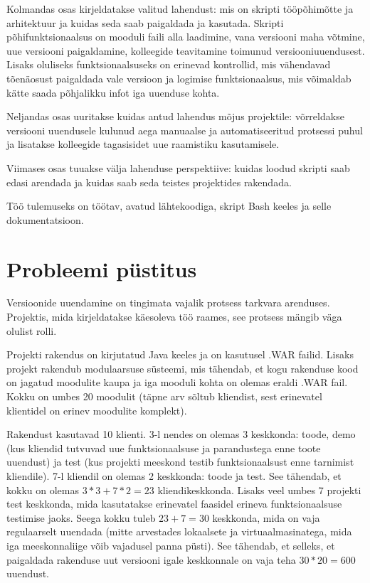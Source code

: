 \documentclass[12pt]{report}
\begin{document}
  Kolmandas osas kirjeldatakse valitud lahendust: mis on skripti tööpõhimõtte ja arhitektuur ja kuidas seda saab paigaldada ja kasutada. Skripti põhifunktsionaalsus on mooduli faili alla laadimine, vana versiooni maha võtmine, uue versiooni paigaldamine, kolleegide teavitamine toimunud versiooniuuendusest. Lisaks oluliseks funktsionaalsuseks on erinevad kontrollid, mis vähendavad tõenäosust paigaldada vale versioon ja logimise funktsionaalsus, mis võimaldab kätte saada põhjalikku infot iga uuenduse kohta.
  
  Neljandas osas uuritakse kuidas antud lahendus mõjus projektile: võrreldakse versiooni uuendusele kulunud aega manuaalse ja automatiseeritud protsessi puhul ja lisatakse kolleegide tagasisidet uue raamistiku kasutamisele.
  
  Viimases osas tuuakse välja lahenduse perspektiive: kuidas loodud skripti saab edasi arendada ja kuidas saab seda teistes projektides rakendada.
  
  Töö tulemuseks on töötav, avatud lähtekoodiga, skript Bash keeles ja selle dokumentatsioon.
  
  \newpage
  
  \section{Probleemi püstitus}
  
  Versioonide uuendamine on tingimata vajalik protsess tarkvara arenduses. Projektis, mida kirjeldatakse käesoleva töö raames, see protsess mängib väga olulist rolli.
  
  Projekti rakendus on kirjutatud Java keeles ja on kasutusel .WAR failid. Lisaks projekt rakendub modulaarsuse süsteemi, mis tähendab, et kogu rakenduse kood on jagatud moodulite kaupa ja iga mooduli kohta on olemas eraldi .WAR fail. Kokku on umbes 20 moodulit (täpne arv sõltub kliendist, sest erinevatel klientidel on erinev moodulite komplekt).
  
  Rakendust kasutavad 10 klienti. 3-l nendes on olemas 3 keskkonda: toode, demo (kus kliendid tutvuvad uue funktsionaalsuse ja parandustega enne toote uuendust) ja test (kus projekti meeskond testib funktsionaalsust enne tarnimist kliendile). 7-l kliendil on olemas 2 keskkonda: toode ja test. See tähendab, et kokku on olemas $3*3+7*2=23$ kliendikeskkonda. Lisaks veel umbes 7 projekti test keskkonda, mida kasutatakse erinevatel faasidel erineva funktsionaalsuse testimise jaoks. Seega kokku tuleb $23+7=30$ keskkonda, mida on vaja regulaarselt uuendada (mitte arvestades lokaalsete ja virtuaalmasinatega, mida iga meeskonnaliige võib vajadusel panna püsti). See tähendab, et selleks, et paigaldada rakenduse uut versiooni igale keskkonnale on vaja teha $30*20=600$ uuendust.
  
\end{document}
